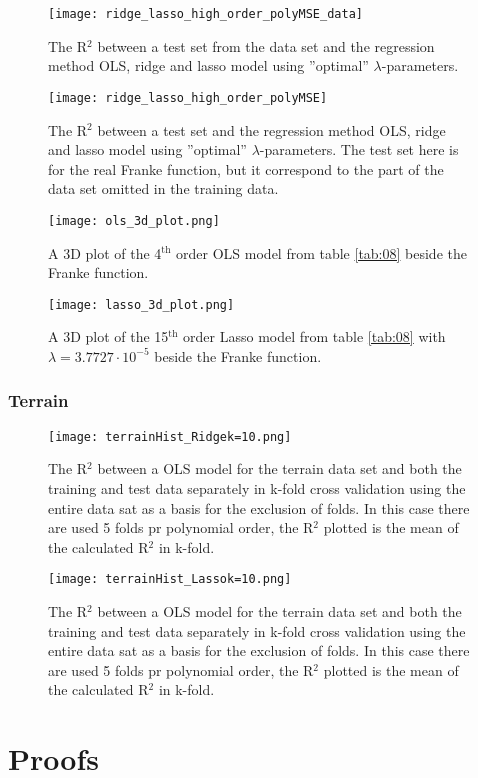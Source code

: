 \documentclass[uio,jmp,amsmath,amssymb,reprint,nofootinbib]{revtex4-1}
\numberwithin{equation}{section}
\begin{document}
\begin{figure}[H]
    \centering
    \texttt{[image: ridge\_lasso\_high\_order\_polyMSE\_data]}
    \caption{The R\(^2\) between a test set from the data set and the regression method OLS, ridge and lasso model using ''optimal'' \(\lambda\)-parameters.}
    \label{fig:optimal_mse_franke}
\end{figure}

\begin{figure}[H]
    \centering
    \texttt{[image: ridge\_lasso\_high\_order\_polyMSE]}
    \caption{The R\(^2\) between a test set and the regression method OLS, ridge and lasso model using ''optimal'' \(\lambda\)-parameters. The test set here is for the real Franke function, but it correspond to the part of the data set omitted in the training data.}
    \label{fig:optimal_mse_data}
\end{figure}

\begin{figure}[H]
    \centering
    \texttt{[image: ols\_3d\_plot.png]}
    \caption{A 3D plot of the 4\(^\text{th}\) order OLS model from table \ref{tab:08} beside the Franke function.}
    \label{fig:ridge_3d}
\end{figure}

\begin{figure}[H]
    \centering
    \texttt{[image: lasso\_3d\_plot.png]}
    \caption{A 3D plot of the 15\(^\text{th}\) order Lasso model from table \ref{tab:08} with \(\lambda = 3.7727\cdot 10^{-5}\) beside the Franke function.}
    \label{fig:ridge_3d}
\end{figure}

\subsubsection{Terrain}

\begin{figure}[H]
    \centering
    \texttt{[image: terrainHist\_Ridgek=10.png]}
    \caption{The R\(^2\) between a OLS model for the terrain data set and both the training and test data separately in k-fold cross validation using the entire data sat as a basis for the exclusion of folds. In this case there are used 5 folds pr polynomial order, the R\(^2\) plotted is the mean of the calculated R\(^2\) in k-fold.}
    \label{fig:hist_terrain_ridge}
\end{figure}

\begin{figure}[H]
    \centering
    \texttt{[image: terrainHist\_Lassok=10.png]}
    \caption{The R\(^2\) between a OLS model for the terrain data set and both the training and test data separately in k-fold cross validation using the entire data sat as a basis for the exclusion of folds. In this case there are used 5 folds pr polynomial order, the R\(^2\) plotted is the mean of the calculated R\(^2\) in k-fold.}
    \label{fig:hist_terrain_lasso}
\end{figure}

\section{Proofs}


\onecolumngrid



\end{document}

